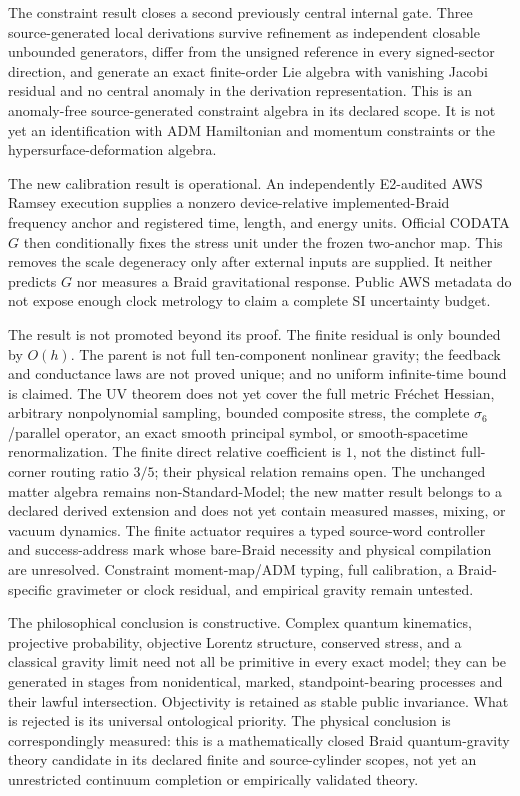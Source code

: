\documentclass[11pt]{article}
\theoremstyle{definition}
\theoremstyle{remark}
\begin{document}
The constraint result closes a second previously central internal gate. Three source-generated local derivations survive refinement as independent closable unbounded generators, differ from the unsigned reference in every signed-sector direction, and generate an exact finite-order Lie algebra with vanishing Jacobi residual and no central anomaly in the derivation representation. This is an anomaly-free source-generated constraint algebra in its declared scope. It is not yet an identification with ADM Hamiltonian and momentum constraints or the hypersurface-deformation algebra.

The new calibration result is operational. An independently E2-audited AWS Ramsey execution supplies a nonzero device-relative implemented-Braid frequency anchor and registered time, length, and energy units. Official CODATA $G$ then conditionally fixes the stress unit under the frozen two-anchor map. This removes the scale degeneracy only after external inputs are supplied. It neither predicts $G$ nor measures a Braid gravitational response. Public AWS metadata do not expose enough clock metrology to claim a complete SI uncertainty budget.

The result is not promoted beyond its proof. The finite residual is only bounded by $O(h)$. The parent is not full ten-component nonlinear gravity; the feedback and conductance laws are not proved unique; and no uniform infinite-time bound is claimed. The UV theorem does not yet cover the full metric Fr\'echet Hessian, arbitrary nonpolynomial sampling, bounded composite stress, the complete $\sigma_6$/parallel operator, an exact smooth principal symbol, or smooth-spacetime renormalization. The finite direct relative coefficient is $1$, not the distinct full-corner routing ratio $3/5$; their physical relation remains open. The unchanged matter algebra remains non-Standard-Model; the new matter result belongs to a declared derived extension and does not yet contain measured masses, mixing, or vacuum dynamics. The finite actuator requires a typed source-word controller and success-address mark whose bare-Braid necessity and physical compilation are unresolved. Constraint moment-map/ADM typing, full calibration, a Braid-specific gravimeter or clock residual, and empirical gravity remain untested.

The philosophical conclusion is constructive. Complex quantum kinematics, projective probability, objective Lorentz structure, conserved stress, and a classical gravity limit need not all be primitive in every exact model; they can be generated in stages from nonidentical, marked, standpoint-bearing processes and their lawful intersection. Objectivity is retained as stable public invariance. What is rejected is its universal ontological priority. The physical conclusion is correspondingly measured: this is a mathematically closed Braid quantum-gravity theory candidate in its declared finite and source-cylinder scopes, not yet an unrestricted continuum completion or empirically validated theory.
\end{document}
